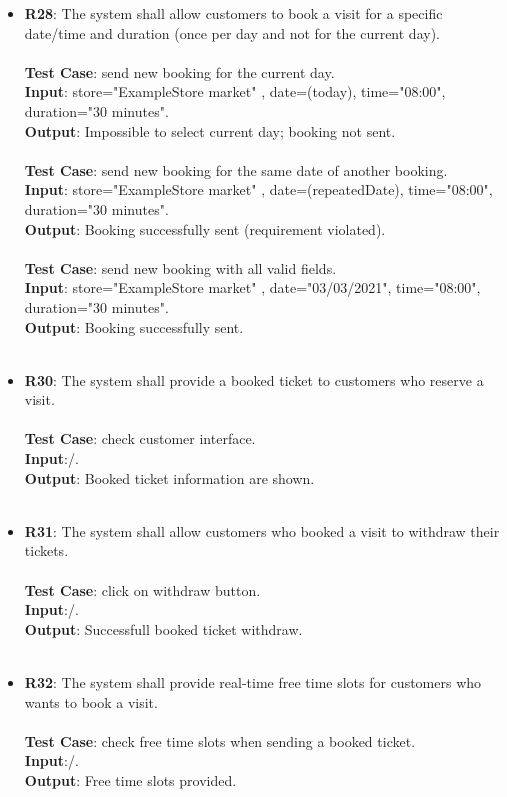\begin{itemize}
	\item \textbf{R28}: The system shall allow customers to book a visit for a specific date/time and duration (once per day and not for the current day). \\ \\ \textbf{Test Case}: send new booking for the current day.  \\ 
 \textbf{Input}: store="ExampleStore market" , date=(today), time="08:00", duration="30 minutes".\\ 		\textbf{Output}: Impossible to select current day; booking not sent. 
\\ \\ \textbf{Test Case}: send new booking for the same date of another booking.  \\ 
 \textbf{Input}: store="ExampleStore market" , date=(repeatedDate), time="08:00", duration="30 minutes".\\ 		\textbf{Output}: Booking successfully sent (requirement violated). \\ \\ \textbf{Test Case}: send new booking with all valid fields.  \\ 
 \textbf{Input}: store="ExampleStore market" , date="03/03/2021", time="08:00", duration="30 minutes".\\ 		\textbf{Output}:  Booking successfully sent. \\ \\


	\item \textbf{R30}: The system shall provide a booked ticket to customers who reserve a visit.  \\ \\ \textbf{Test Case}: check customer interface.  \\ 
 \textbf{Input}:/.\\ 		\textbf{Output}: Booked ticket information are shown. \\ \\


	\item \textbf{R31}: The system shall allow customers who booked a visit to withdraw their tickets. \\ \\ \textbf{Test Case}: click on withdraw button.  \\ 
 \textbf{Input}:/.\\ 		\textbf{Output}: Successfull booked ticket withdraw. \\ \\


	\item \textbf{R32}: The system shall provide real-time free time slots for customers who wants to book a visit. \\ \\ \textbf{Test Case}: check free time slots when sending a booked ticket.  \\ 
 \textbf{Input}:/.\\ 		\textbf{Output}: Free time slots provided. \\ \\	


\end{itemize}







